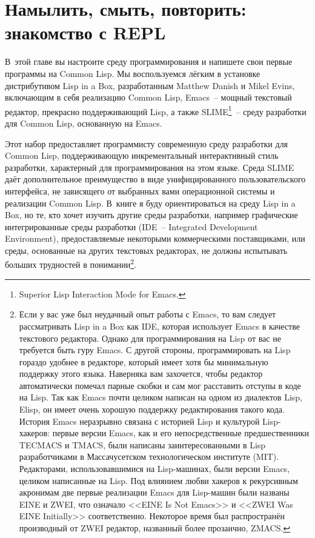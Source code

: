 \chapter{Намылить, смыть, повторить: знакомство с REPL}
\label{ch:02}

\thispagestyle{empty}

В~этой главе вы настроите среду программирования и напишете свои первые программы на
Common Lisp. Мы воспользуемся лёгким в установке дистрибутивом Lisp in a Box,
разработанным Matthew Danish и Mikel Evins, включающим в себя реализацию
Common Lisp, Emacs~-- мощный текстовый редактор, прекрасно поддерживающий Lisp, а
также SLIME\footnote{Superior Lisp Interaction Mode for Emacs.}~-- среду
разработки для Common Lisp, основанную на Emacs.

Этот набор предоставляет программисту современную среду разработки для Common Lisp,
поддерживающую инкрементальный интерактивный стиль разработки, характерный для
программирования на этом языке. Среда SLIME даёт дополнительное преимущество в виде
унифицированного пользовательского интерфейса, не зависящего от выбранных вами
операционной системы и реализации Common Lisp. В~книге я буду ориентироваться на
среду Lisp in a Box, но те, кто хочет изучить другие среды разработки, например
графические интегрированные среды разработки (IDE~-- Integrated Development Environment),
предоставляемые некоторыми коммерческими поставщиками, или среды, основанные на других
текстовых редакторах, не должны испытывать больших трудностей в понимании\footnote{Если у
  вас уже был неудачный опыт работы с Emacs, то вам следует рассматривать Lisp in a Box как
  IDE, которая использует Emacs в качестве текстового редактора.  Однако для программирования
  на Lisp от вас не требуется быть гуру Emacs. С другой стороны, программировать на Lisp
  гораздо удобнее в редакторе, который имеет хотя бы минимальную поддержку этого языка.
  Наверняка вам захочется, чтобы редактор автоматически помечал парные скобки и
  сам мог расставить отступы в коде на Lisp. Так как Emacs почти целиком написан на одном
  из диалектов Lisp, Elisp, он имеет очень хорошую поддержку редактирования такого
  кода. История Emacs неразрывно связана с историей Lisp и культурой Lisp-хакеров: первые
  версии Emacs, как и его непосредственные предшественники TECMACS и
  TMACS, были написаны заинтересованными в Lisp разработчиками в Массачусетском
  технологическом институте (MIT). Редакторами, использовавшимися на Lisp-машинах, были
  версии Emacs, целиком написанные на Lisp. Под влиянием любви хакеров к рекурсивным
  акронимам две первые реализации Emacs для Lisp-машин были названы EINE и
  ZWEI, что означало <<EINE Is Not Emacs>> и <<ZWEI Was EINE Initially>>
  соответственно. Некоторое время был распространён производный от ZWEI редактор,
  названный более прозаично, ZMACS.}.

